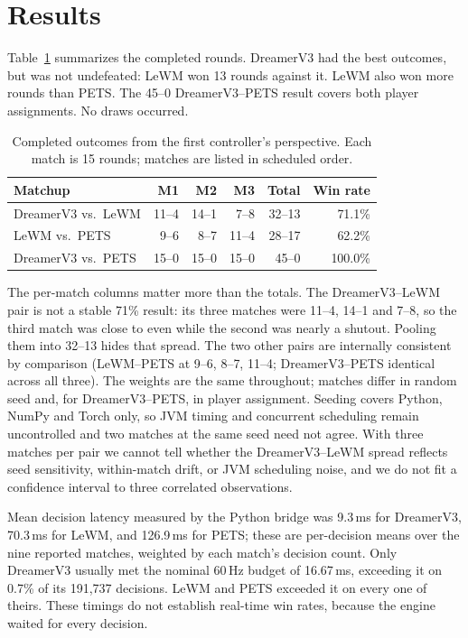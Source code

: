 \documentclass[10pt,twocolumn]{article}
\newcommand{\lewm}{LeWM}
\newcommand{\dreamer}{DreamerV3}
\newcommand{\pets}{PETS}
\begin{document}
\section{Results}
\label{sec:results}

Table~\ref{tab:results} summarizes the completed rounds.  \dreamer{} had the
best outcomes, but was not undefeated: \lewm{} won 13 rounds against it.
\lewm{} also won more rounds than \pets{}.  The 45--0
\dreamer{}--\pets{} result covers both player assignments.  No draws occurred.

\begin{table}[ht]
\centering
\caption{Completed outcomes from the first controller's perspective.
Each match is 15 rounds; matches are listed in scheduled order.}
\label{tab:results}
\small
\setlength{\tabcolsep}{4pt}
\begin{tabular}{lrrrrr}
\toprule
Matchup & M1 & M2 & M3 & Total & Win rate \\
\midrule
\dreamer{} vs.\ \lewm{} & 11--4 & 14--1 & 7--8 & 32--13 & 71.1\% \\
\lewm{} vs.\ \pets{} & 9--6 & 8--7 & 11--4 & 28--17 & 62.2\% \\
\dreamer{} vs.\ \pets{} & 15--0 & 15--0 & 15--0 & 45--0 & 100.0\% \\
\bottomrule
\end{tabular}
\end{table}

The per-match columns matter more than the totals.  The \dreamer{}--\lewm{}
pair is not a stable 71\% result: its three matches were 11--4, 14--1 and
7--8, so the third match was close to even while the second was nearly a
shutout.  Pooling them into 32--13 hides that spread.  The two other pairs
are internally consistent by comparison (\lewm{}--\pets{} at 9--6, 8--7,
11--4; \dreamer{}--\pets{} identical across all three).  The weights are the
same throughout; matches differ in random seed and, for \dreamer{}--\pets{},
in player assignment.  Seeding covers Python, NumPy and Torch only, so JVM
timing and concurrent scheduling remain uncontrolled and two matches at the
same seed need not agree.  With three matches per pair we cannot tell whether
the \dreamer{}--\lewm{} spread reflects seed sensitivity, within-match
drift, or JVM scheduling noise, and we do not fit a confidence interval to
three correlated observations.

Mean decision latency measured by the Python bridge was 9.3\,ms for
\dreamer{}, 70.3\,ms for \lewm{}, and 126.9\,ms for \pets{}; these are
per-decision means over the nine reported matches, weighted by each match's
decision count.  Only \dreamer{} usually met the nominal 60\,Hz budget of
16.67\,ms, exceeding it on 0.7\% of its 191,737 decisions.  \lewm{} and
\pets{} exceeded it on every one of theirs.
These timings do not establish real-time win rates, because the engine
waited for every decision.
\end{document}
